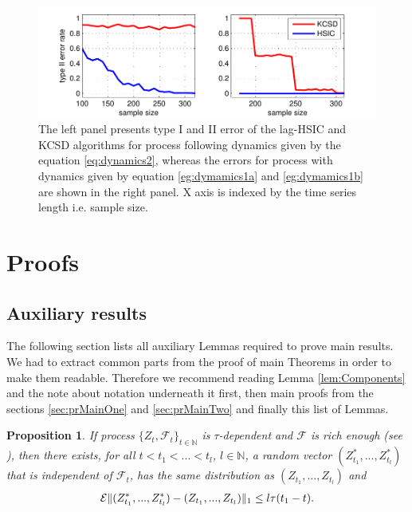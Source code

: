\documentclass{article} %
\newtheorem{proposition}{Proposition}
\newcommand{\ev}{\mathcal{E}}
\DeclarePairedDelimiter\norm{\lVert}{\rVert}
\begin{document}
\begin{figure}
\centering  
\includegraphics[width=1\textwidth]{varAndPhase.pdf}
\caption{The left panel presents type I and II error of the lag-HSIC and KCSD algorithms for process following dynamics given by the equation \eqref{eq:dynamics2}, whereas the errors for process with dynamics given by equation \eqref{eg:dymamics1a} and \eqref{eg:dymamics1b} are shown in the right panel. X axis is indexed by the time series length i.e. sample size.}
\label{fig:phaseAndVar}
\end{figure}
\small



\newpage
\normalsize
\appendix
\section{Proofs}

\subsection{Auxiliary results }
\label{label:aux}
The following section lists all auxiliary Lemmas required to prove main results. We had to extract common parts from the proof of main Theorems in order to make them readable. Therefore we recommend reading Lemma \ref{lem:Components} and the note about notation underneath it first, then main proofs from the sections \ref{sec:prMainOne} and \ref{sec:prMainTwo} and finally this list of Lemmas. 

\begin{proposition}{\cite[p.259, Equation 2.1]{leucht_dependent_2013}}
\label{prop:Coupling}
If process  $\{Z_t,\mathcal{F}_t\}_{t \in \mathbb{N}}$  is $\tau$-dependent and $\mathcal{F}$ is rich enough (see \cite[Lemma 5.3]{dedecker2007weak}), then there exists, for all $t<t_1<...<t_l$, $l \in \mathbb N$, a random vector $(Z_{t_1}^*,...,Z_{t_l}^*)$ that is independent of $\mathcal F_t$, has the same distribution  as $(Z_{t_1},...,Z_{t_l})$ and 
\begin{align*}
\ev \norm{(Z_{t_1}^*,...,Z_{t_l}^*) - (Z_{t_1},...,Z_{t_l})}_1 \leq l \tau(t_1-t).
\end{align*}
\end{proposition}
\end{document}
